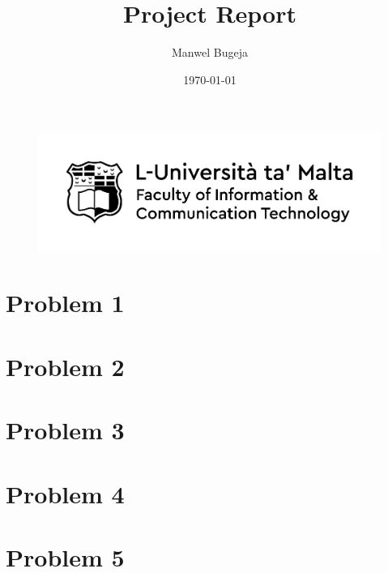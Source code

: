 \documentclass[a4paper, 12pt]{article}
\begin{document}
\begin{figure}
    \centering
    \includegraphics[width=1\textwidth]{Logo}
\end{figure}

\title{Project Report}
\author{Manwel Bugeja}
\date{\today}
\maketitle
  
\tableofcontents
\newpage


\section{Problem 1}
\section{Problem 2}
\section{Problem 3}
\section{Problem 4}
\section{Problem 5}


 
\end{document}
